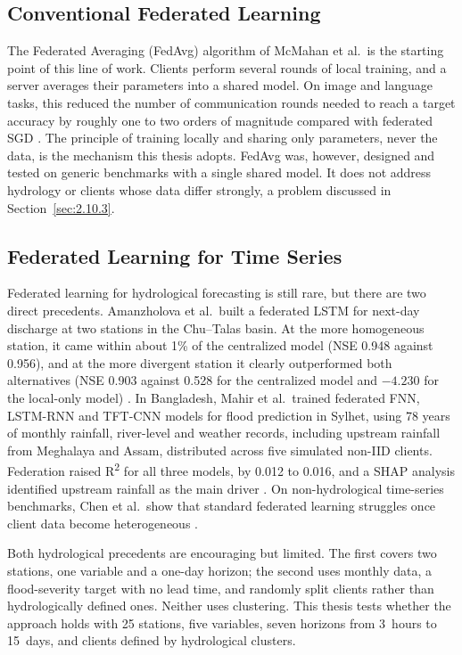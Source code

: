 \subsection{Conventional Federated Learning}
\label{sec:2.10.1}

The Federated Averaging (FedAvg) algorithm of McMahan et al.\ is the starting
point of this line of work. Clients perform several rounds of local training,
and a server averages their parameters into a shared model. On image and
language tasks, this reduced the number of communication rounds needed to reach
a target accuracy by roughly one to two orders of magnitude compared with
federated SGD \cite{McMahan2017}. The principle of training locally and sharing
only parameters, never the data, is the mechanism this thesis adopts. FedAvg
was, however, designed and tested on generic benchmarks with a single shared
model. It does not address hydrology or clients whose data differ strongly, a
problem discussed in Section~\ref{sec:2.10.3}.

\subsection{Federated Learning for Time Series}
\label{sec:2.10.2}

Federated learning for hydrological forecasting is still rare, but there are
two direct precedents. Amanzholova et al.\ built a federated LSTM for next-day
discharge at two stations in the Chu--Talas basin. At the more homogeneous
station, it came within about 1\% of the centralized model (NSE 0.948 against
0.956), and at the more divergent station it clearly outperformed both
alternatives (NSE 0.903 against 0.528 for the centralized model and $-4.230$
for the local-only model) \cite{Amanzholova2026}. In Bangladesh, Mahir et al.\
trained federated FNN, LSTM-RNN and TFT-CNN models for flood prediction in
Sylhet, using 78 years of monthly rainfall, river-level and weather records,
including upstream rainfall from Meghalaya and Assam, distributed across five
simulated non-IID clients. Federation raised R\textsuperscript{2} for all three
models, by 0.012 to 0.016, and a SHAP analysis identified upstream rainfall as
the main driver \cite{Mahir2025}. On non-hydrological time-series benchmarks,
Chen et al.\ show that standard federated learning struggles once client data
become heterogeneous \cite{Chen2025}.

Both hydrological precedents are encouraging but limited. The first covers two
stations, one variable and a one-day horizon; the second uses monthly data, a
flood-severity target with no lead time, and randomly split clients rather
than hydrologically defined ones. Neither uses clustering. This thesis tests
whether the approach holds with 25 stations, five variables, seven horizons
from 3~hours to 15~days, and clients defined by hydrological clusters.

